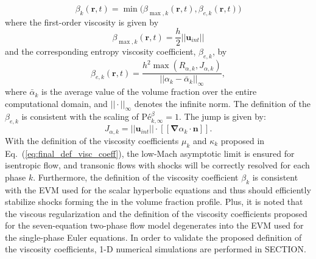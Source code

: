 \documentclass[preprint,10pt]{elsarticle}
\newcommand{\grad}{\mbold{\nabla}}
\newcommand{\mbold}[1]{\boldsymbol#1}
\newcommand{\Pe}{\textrm{P\'e}}
\newcommand{\eqt}[1]{Eq.~(\ref{#1})}                     %
\begin{document}
%
\begin{equation}\label{eq:first-order-beta-sct4-sem}
\beta_k(\mbold r,t) = \min \Big (\beta_{\max,k}(\mbold r,t), \beta_{e,k} (\mbold r,t) \Big ) 
\end{equation}
%
where the first-order viscosity is given by
\begin{equation}\label{eq:first-order-beta-max-sct4-sem}
\beta_{\max,k} (\mbold r,t) = \frac{h}{2} ||\mbold u_{int}||
\end{equation}
%
and the corresponding entropy viscosity coefficient, $\beta_{e,k}$, by 
%
\begin{equation}
\beta_{e,k}(\mbold r,t) = \frac{h^2 \max(R_{\alpha,k}, J_{\alpha,k})}{|| \alpha_k - \bar{\alpha}_k ||_\infty},
\end{equation}
where $\bar{\alpha}_k$ is the average value of the volume fraction over the entire computational domain, and $|| \cdot ||_\infty$ denotes the infinite norm. The definition of the $\beta_{e,k}$ is consistent with the scaling of $\Pe^\beta_{k,\infty} = 1$. The jump is given by:
%
\begin{equation}
J_{\alpha,k} = || \mbold u_{int} || \cdot [[ \grad \alpha_k \cdot \mbold n ]]. 
\end{equation}
With the definition of the viscosity coefficients $\mu_k$ and $\kappa_k$ proposed in \eqt{eq:final_def_visc_coeff}, the low-Mach asymptotic limit is ensured for isentropic flow, and transonic flows with shocks will be correctly resolved for each phase $k$. Furthermore, the definition of the viscosity coefficient $\beta_k$ is consistent with the EVM used for the scalar hyperbolic equations and thus should efficiently stabilize shocks forming the in the volume fraction profile. Plus, it is noted that the viscous regularization and the definition of the viscosity coefficients proposed for the seven-equation two-phase flow model degenerates into the EVM used for the single-phase Euler equations. In order to validate the proposed definition of the viscosity coefficients, 1-D numerical simulations are performed in SECTION.
%
\end{document}
